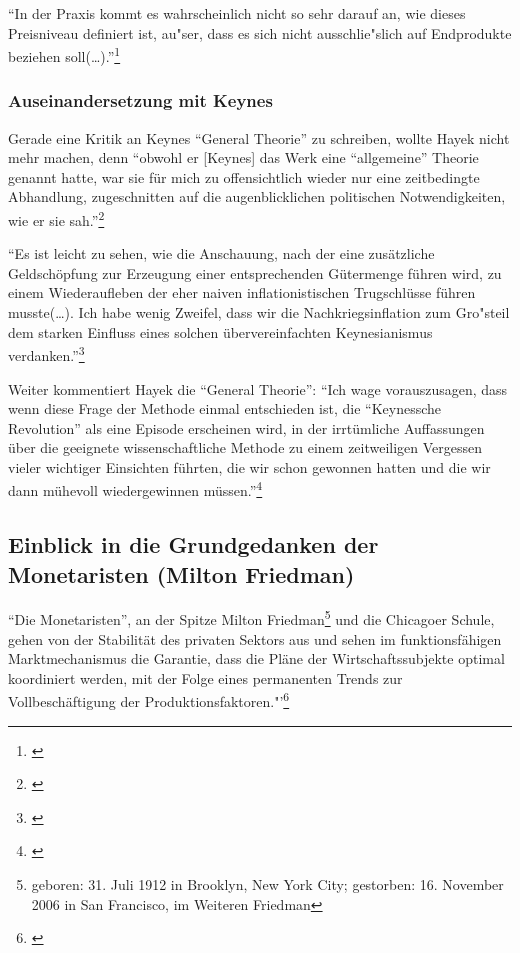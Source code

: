\documentclass[
        onecolumn,
        a4paper,
        abstracton,
        parskip=half
        ,final
        ]{scrartcl}
\begin{document}
"`In der Praxis kommt es wahrscheinlich nicht so sehr darauf an, wie dieses Preisniveau definiert ist, au{"s}er, dass es sich nicht ausschlie{"s}lich auf Endprodukte beziehen soll(\ldots)."'\footnote[77]{\citep*[S.423]{hayek1971}}

\subsubsection{Auseinandersetzung mit Keynes}

Gerade eine Kritik an Keynes "`General Theorie"' zu schreiben, wollte Hayek nicht mehr machen, denn "`obwohl er [Keynes] das Werk eine "`allgemeine"' Theorie genannt hatte, war sie f{\"u}r mich zu offensichtlich wieder nur eine zeitbedingte Abhandlung, zugeschnitten auf die augenblicklichen politischen Notwendigkeiten, wie er sie sah."'\footnote[78]{\citep*[S.91]{Hayek1969}}

"`Es ist leicht zu sehen, wie die Anschauung, nach der eine zus{\"a}tzliche Geldsch{\"o}pfung zur Erzeugung einer entsprechenden G{\"u}termenge f{\"u}hren wird, zu einem Wiederaufleben der eher naiven inflationistischen Trugschl{\"u}sse f{\"u}hren musste(\ldots). Ich habe wenig Zweifel, dass wir die Nachkriegsinflation zum Gro{"s}teil dem starken Einfluss eines solchen {\"u}bervereinfachten Keynesianismus verdanken."'\footnote[79]{\citep*[S.93]{Hayek1969}}

Weiter kommentiert Hayek die "`General Theorie"':
"`Ich wage vorauszusagen, dass wenn diese Frage der Methode einmal entschieden ist, die "`Keynessche Revolution"' als eine Episode erscheinen wird, in der irrt{\"u}mliche Auffassungen {\"u}ber die geeignete wissenschaftliche Methode zu einem zeitweiligen Vergessen vieler wichtiger Einsichten f{\"u}hrten, die wir schon gewonnen hatten und die wir dann m{\"u}hevoll wiedergewinnen m{\"u}ssen."'\footnote[80]{\citep*[S.96]{Hayek1969}}

\subsection{Einblick in die Grundgedanken der Monetaristen (Milton Friedman)} %

"`Die Monetaristen"', an der Spitze Milton Friedman\footnote[16]{geboren: 31. Juli 1912 in Brooklyn, New York City; gestorben: 16. November 2006 in San Francisco, im Weiteren Friedman} und die Chicagoer Schule, gehen von der Stabilit{\"a}t des privaten Sektors aus und sehen im
funktionsf{\"a}higen Marktmechanismus die Garantie, dass die Pl{\"a}ne der Wirtschaftssubjekte optimal koordiniert werden, mit der Folge eines permanenten Trends zur Vollbesch{\"a}ftigung der Produktionsfaktoren."'\footnote[81]{\citep*[vgl.][S.210]{peters2000}}
\end{document}
